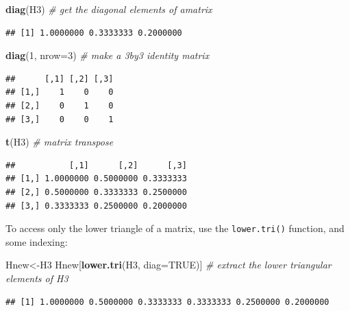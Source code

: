 \documentclass[]{article}
\newenvironment{Shaded}{\begin{snugshade}}{\end{snugshade}}
\newcommand{\KeywordTok}[1]{\textcolor[rgb]{0.13,0.29,0.53}{\textbf{#1}}}
\newcommand{\DataTypeTok}[1]{\textcolor[rgb]{0.13,0.29,0.53}{#1}}
\newcommand{\DecValTok}[1]{\textcolor[rgb]{0.00,0.00,0.81}{#1}}
\newcommand{\CommentTok}[1]{\textcolor[rgb]{0.56,0.35,0.01}{\textit{#1}}}
\newcommand{\OtherTok}[1]{\textcolor[rgb]{0.56,0.35,0.01}{#1}}
\newcommand{\NormalTok}[1]{#1}
\begin{document}
\begin{Shaded}
\begin{Highlighting}[]
\KeywordTok{diag}\NormalTok{(H3) }\CommentTok{# get the diagonal elements of amatrix}
\end{Highlighting}
\end{Shaded}

\begin{verbatim}
## [1] 1.0000000 0.3333333 0.2000000
\end{verbatim}

\begin{Shaded}
\begin{Highlighting}[]
\KeywordTok{diag}\NormalTok{(}\DecValTok{1}\NormalTok{, }\DataTypeTok{nrow=}\DecValTok{3}\NormalTok{) }\CommentTok{# make a 3by3 identity matrix}
\end{Highlighting}
\end{Shaded}

\begin{verbatim}
##      [,1] [,2] [,3]
## [1,]    1    0    0
## [2,]    0    1    0
## [3,]    0    0    1
\end{verbatim}

\begin{Shaded}
\begin{Highlighting}[]
\KeywordTok{t}\NormalTok{(H3) }\CommentTok{# matrix transpose}
\end{Highlighting}
\end{Shaded}

\begin{verbatim}
##           [,1]      [,2]      [,3]
## [1,] 1.0000000 0.5000000 0.3333333
## [2,] 0.5000000 0.3333333 0.2500000
## [3,] 0.3333333 0.2500000 0.2000000
\end{verbatim}

To access only the lower triangle of a matrix, use the
\texttt{lower.tri()} function, and some indexing:

\begin{Shaded}
\begin{Highlighting}[]
\NormalTok{Hnew<-H3}
\NormalTok{Hnew[}\KeywordTok{lower.tri}\NormalTok{(H3, }\DataTypeTok{diag=}\OtherTok{TRUE}\NormalTok{)] }\CommentTok{# extract the lower triangular elements of H3}
\end{Highlighting}
\end{Shaded}

\begin{verbatim}
## [1] 1.0000000 0.5000000 0.3333333 0.3333333 0.2500000 0.2000000
\end{verbatim}
\end{document}
